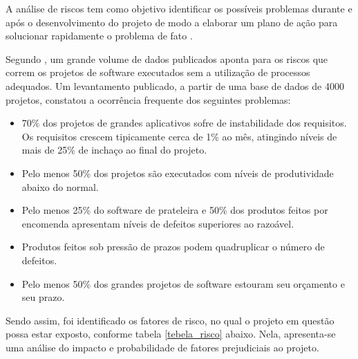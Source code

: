 A análise de riscos tem como objetivo identificar os possíveis problemas durante e após o desenvolvimento do projeto de modo a elaborar um plano de ação para solucionar rapidamente o problema de fato \cite{schmitzanalise}.

Segundo \cite{de2003engenharia}, um grande volume de dados publicados aponta para os riscos que correm os projetos de software executados sem a utilização de processos adequados. Um levantamento publicado, a partir de uma base de dados de 4000 projetos, constatou a ocorrência frequente dos seguintes problemas:

\begin{itemize}
	
	\item 70\% dos projetos de grandes aplicativos sofre de instabilidade dos requisitos. Os requisitos crescem tipicamente cerca de 1\% ao mês, atingindo níveis de mais de 25\% de inchaço ao final
	do projeto.
	
	\item Pelo menos 50\% dos projetos são executados com níveis de produtividade abaixo do normal.
	
	\item Pelo menos 25\% do software de prateleira e 50\% dos produtos feitos por encomenda apresentam níveis de defeitos superiores ao razoável. 
	
	\item Produtos feitos sob pressão de prazos podem quadruplicar o número de defeitos.
	
	\item Pelo menos 50\% dos grandes projetos de software estouram seu orçamento e seu prazo.
	
\end{itemize}

Sendo assim, foi identificado os fatores de risco, no qual o projeto em questão possa estar exposto, conforme tabela \ref{tebela_risco} abaixo. Nela, apresenta-se uma análise do impacto e probabilidade de fatores prejudiciais ao projeto.

